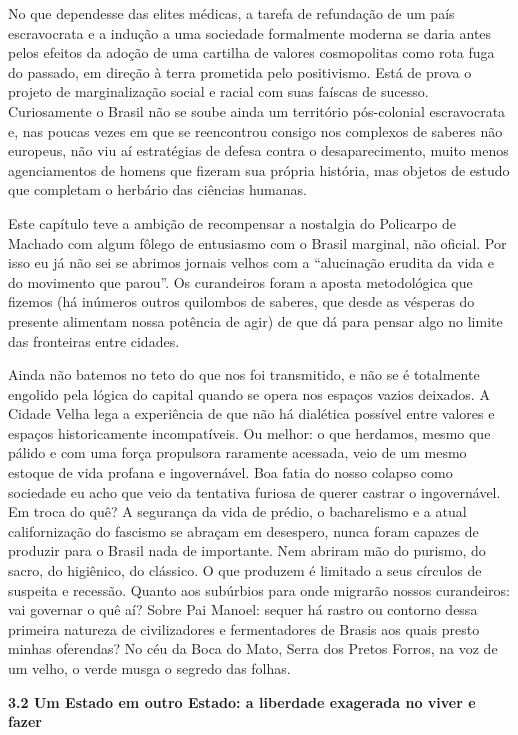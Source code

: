 No que dependesse das elites médicas, a tarefa de refundação de um país
escravocrata e a indução a uma sociedade formalmente moderna se daria
antes pelos efeitos da adoção de uma cartilha de valores cosmopolitas
como rota fuga do passado, em direção à terra prometida pelo
positivismo. Está de prova o projeto de marginalização social e racial
com suas faíscas de sucesso. Curiosamente o Brasil não se soube ainda um
território pós-colonial escravocrata e, nas poucas vezes em que se
reencontrou consigo nos complexos de saberes não europeus, não viu aí
estratégias de defesa contra o desaparecimento, muito menos
agenciamentos de homens que fizeram sua própria história, mas objetos de
estudo que completam o herbário das ciências humanas.

Este capítulo teve a ambição de recompensar a nostalgia do Policarpo de
Machado com algum fôlego de entusiasmo com o Brasil marginal, não
oficial. Por isso eu já não sei se abrimos jornais velhos com a
``alucinação erudita da vida e do movimento que parou''. Os curandeiros
foram a aposta metodológica que fizemos (há inúmeros outros quilombos de
saberes, que desde as vésperas do presente alimentam nossa potência de
agir) de que dá para pensar algo no limite das fronteiras entre cidades.

Ainda não batemos no teto do que nos foi transmitido, e não se é
totalmente engolido pela lógica do capital quando se opera nos espaços
vazios deixados. A Cidade Velha lega a experiência de que não há
dialética possível entre valores e espaços historicamente incompatíveis.
Ou melhor: o que herdamos, mesmo que pálido e com uma força propulsora
raramente acessada, veio de um mesmo estoque de vida profana e
ingovernável. Boa fatia do nosso colapso como sociedade eu acho que veio
da tentativa furiosa de querer castrar o ingovernável. Em troca do quê?
A segurança da vida de prédio, o bacharelismo e a atual californização
do fascismo se abraçam em desespero, nunca foram capazes de produzir
para o Brasil nada de importante. Nem abriram mão do purismo, do sacro,
do higiênico, do clássico. O que produzem é limitado a seus círculos de
suspeita e recessão. Quanto aos subúrbios para onde migrarão nossos
curandeiros: vai governar o quê aí? Sobre Pai Manoel: sequer há rastro
ou contorno dessa primeira natureza de civilizadores e fermentadores de
Brasis aos quais presto minhas oferendas? No céu da Boca do Mato, Serra
dos Pretos Forros, na voz de um velho, o verde musga o segredo das
folhas.

\textbf{3.2 Um Estado em outro Estado: a liberdade exagerada no viver e
fazer}

